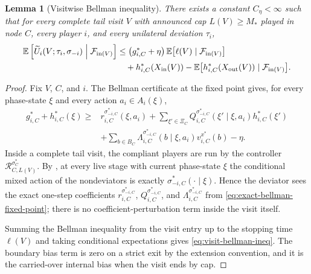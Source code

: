 \documentclass[12pt]{article}
\newtheorem{lemma}[theorem]{Lemma}
\theoremstyle{definition}
\newcommand{\E}{\mathbb{E}}
\newcommand{\1}{\mathbf{1}}
\newcommand{\cF}{\mathcal{F}}
\begin{document}
\begin{lemma}[Visitwise Bellman inequality]
\label{lem:visit-bellman}
There exists a constant $C_\eta<\infty$ such that for every complete tail visit
$V$ with announced cap $L(V)\ge M_*$ played in node $C$, every player $i$, and
every unilateral deviation $\tau_i$,
\begin{equation}
\label{eq:visit-bellman-ineq}
\begin{aligned}
\E\left[
\widetilde U_i(V;\tau_i,\sigma_{-i})
\Bigm|\cF_{\mathrm{in}(V)}
\right]
&\le
\bigl(g_{i,C}^*+\eta\bigr)\,
\E\bigl[\ell(V)\mid\cF_{\mathrm{in}(V)}\bigr]
\\
&\quad+
h_{i,C}^*(X_{\mathrm{in}}(V))
-
\E\bigl[h_{i,C}^*(X_{\mathrm{out}}(V))\mid\cF_{\mathrm{in}(V)}\bigr].
\end{aligned}
\end{equation}
\end{lemma}

\begin{proof}
Fix $V$, $C$, and $i$. The Bellman certificate at the fixed point gives, for
every phase-state $\xi$ and every action $a_i\in A_i(\xi)$,
\begin{align}
\label{eq:exact-bellman-fixed-point}
g_{i,C}^* + h_{i,C}^*(\xi)
\ge {}
&r_{i,C}^{\sigma_{-i,C}^*}(\xi,a_i)
+
\sum_{\xi'\in\Xi_C}Q_{i,C}^{\sigma_{-i,C}^*}(\xi'\mid\xi,a_i)h_{i,C}^*(\xi')
\\
&+
\sum_{b\in B_C}\Lambda_{i,C}^{\sigma_{-i,C}^*}(b\mid\xi,a_i)v_{i,C}^{x^*}(b)
-\eta.
\nonumber
\end{align}
Inside a complete tail visit, the compliant players are run by the controller
$\mathcal R_{C,L(V)}^{\sigma_C^*}$. By , at every live
stage with current phase-state $\xi$ the conditional mixed action of the
nondeviators is exactly $\sigma_{-i,C}^*(\cdot\mid\xi)$. Hence the deviator sees
the exact one-step coefficients
$r_{i,C}^{\sigma_{-i,C}^*}$, $Q_{i,C}^{\sigma_{-i,C}^*}$, and
$\Lambda_{i,C}^{\sigma_{-i,C}^*}$ from
\eqref{eq:exact-bellman-fixed-point}; there is no coefficient-perturbation term
inside the visit itself.

Summing the Bellman inequality from the visit entry up to the stopping time
$\ell(V)$ and taking conditional expectations gives
\eqref{eq:visit-bellman-ineq}. The boundary bias term is zero on a strict exit by
the extension convention, and it is the carried-over internal bias when the visit
ends by cap.
\end{proof}
\end{document}
